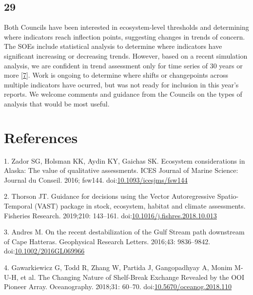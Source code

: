 \documentclass[
  10pt,
]{article}
\begin{document}
\hypertarget{section-28}{%
\subsection{29}\label{section-28}}

Both Councils have been interested in ecosystem-level thresholds and
determining where indicators reach inflection points, suggesting changes
in trends of concern. The SOEs include statistical analysis to determine
where indicators have significant increasing or decreasing trends.
However, based on a recent simulation analysis, we are confident in
trend assessment only for time series of 30 years or more
{[}\protect\hyperlink{ref-hardison_simulation_2019}{7}{]}. Work is
ongoing to determine where shifts or changepoints across multiple
indicators have ocurred, but was not ready for inclusion in this year's
reports. We welcome comments and guidance from the Councils on the types
of analysis that would be most useful.

\hypertarget{references}{%
\section*{References}\label{references}}

\hypertarget{refs}{}
\leavevmode\hypertarget{ref-zador_ecosystem_2016}{}%
1. Zador SG, Holsman KK, Aydin KY, Gaichas SK. Ecosystem considerations
in Alaska: The value of qualitative assessments. ICES Journal of Marine
Science: Journal du Conseil. 2016; fsw144.
doi:\href{https://doi.org/10.1093/icesjms/fsw144}{10.1093/icesjms/fsw144}

\leavevmode\hypertarget{ref-thorson_guidance_2019}{}%
2. Thorson JT. Guidance for decisions using the Vector Autoregressive
Spatio-Temporal (VAST) package in stock, ecosystem, habitat and climate
assessments. Fisheries Research. 2019;210: 143--161.
doi:\href{https://doi.org/10.1016/j.fishres.2018.10.013}{10.1016/j.fishres.2018.10.013}

\leavevmode\hypertarget{ref-andres_recent_2016}{}%
3. Andres M. On the recent destabilization of the Gulf Stream path
downstream of Cape Hatteras. Geophysical Research Letters. 2016;43:
9836--9842.
doi:\href{https://doi.org/10.1002/2016GL069966}{10.1002/2016GL069966}

\leavevmode\hypertarget{ref-gawarkiewicz_changing_2018}{}%
4. Gawarkiewicz G, Todd R, Zhang W, Partida J, Gangopadhyay A, Monim
M-U-H, et al. The Changing Nature of Shelf-Break Exchange Revealed by
the OOI Pioneer Array. Oceanography. 2018;31: 60--70.
doi:\href{https://doi.org/10.5670/oceanog.2018.110}{10.5670/oceanog.2018.110}
\end{document}
